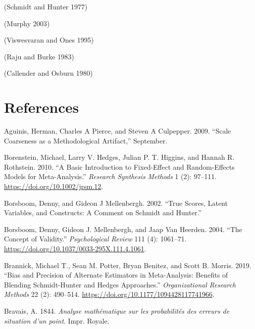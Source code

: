 \documentclass[
  letterpaper,
  DIV=11,
  numbers=noendperiod]{scrreprt}
\newlength{\cslhangindent}
\newlength{\cslentryspacingunit} %
\newenvironment{CSLReferences}[2] %
 {%
  \setlength{\parindent}{0pt}
  \ifodd #1
  \let\oldpar\par
  \def\par{\hangindent=\cslhangindent\oldpar}
  \fi
  \setlength{\parskip}{#2\cslentryspacingunit}
 }%
 {}
\begin{document}
(Schmidt and Hunter 1977)

(Murphy 2003)

(Viswesvaran and Ones 1995)

(Raju and Burke 1983)

(Callender and Osburn 1980)


\hypertarget{references-1}{%
\chapter*{References}\label{references-1}}


\hypertarget{refs}{}
\begin{CSLReferences}{1}{0}
\leavevmode{}%
Aguinis, Herman, Charles A Pierce, and Steven A Culpepper. 2009.
{``Scale Coarseness as a Methodological Artifact,''} September.

\leavevmode{}%
Borenstein, Michael, Larry V. Hedges, Julian P. T. Higgins, and Hannah
R. Rothstein. 2010. {``A Basic Introduction to Fixed-Effect and
Random-Effects Models for Meta-Analysis.''} \emph{Research Synthesis
Methods} 1 (2): 97--111. \url{https://doi.org/10.1002/jrsm.12}.

\leavevmode{}%
Borsboom, Denny, and Gideon J Mellenbergh. 2002. {``True Scores, Latent
Variables, and Constructs: A Comment on Schmidt and Hunter.''}

\leavevmode{}%
Borsboom, Denny, Gideon J. Mellenbergh, and Jaap Van Heerden. 2004.
{``The Concept of Validity.''} \emph{Psychological Review} 111 (4):
1061--71. \url{https://doi.org/10.1037/0033-295X.111.4.1061}.

\leavevmode{}%
Brannick, Michael T., Sean M. Potter, Bryan Benitez, and Scott B.
Morris. 2019. {``Bias and Precision of Alternate Estimators in
Meta-Analysis: Benefits of Blending Schmidt-Hunter and Hedges
Approaches.''} \emph{Organizational Research Methods} 22 (2): 490--514.
\url{https://doi.org/10.1177/1094428117741966}.

\leavevmode{}%
Bravais, A. 1844. \emph{Analyse mathématique sur les probabilités des
erreurs de situation d'un point}. Impr. Royale.


\end{CSLReferences}
\end{document}
